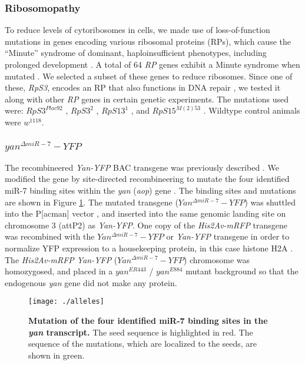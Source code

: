 \subsubsection{Ribosomopathy}
\label{appendix:supp:metabolism:exp:ribosomopathy}

To reduce levels of cytoribosomes in cells, we made use of loss-of-function mutations in genes encoding various ribosomal proteins (RPs), which cause the ``Minute'' syndrome of dominant, haploinsufficient phenotypes, including prolonged development \cite{Sæbøelarssen1998}. A total of 64 \textit{RP} genes exhibit a Minute syndrome when mutated \cite{Marygold2007}. We selected a subset of these genes to reduce ribosomes. Since one of these, \textit{RpS3}, encodes an RP that also functions in DNA repair \cite{Graifer2014}, we tested it along with other \textit{RP} genes in certain genetic experiments. The mutations used were: $RpS3^{Plac92}$ \cite{Sæbøelarssen1998}, $RpS3^{2}$ \cite{Ferrus1975}, $RpS13^{1}$ \cite{Sæbøelarssen1998}, and $RpS15^{M(2)53}$ \cite{Golic1996}. Wildtype control animals were $w^{1118}$.

\subsubsection{$yan^{\Delta miR-7}-YFP$}
\label{appendix:supp:metabolism:exp:yan_delta}

The recombineered \textit{Yan-YFP} BAC transgene was previously described \cite{Webber2013}. We modified the gene by site-directed recombineering to mutate the four identified miR-7 binding sites within the \textit{yan} (\textit{aop}) gene \cite{Li2005}. The binding sites and mutations are shown in Figure \ref{fig:metabolism:methods:alleles}. The mutated transgene ($Yan^{\Delta miR-7}-YFP$) was shuttled into the P{[}acman{]} vector \cite{Venken2006}, and inserted into the same genomic landing site on chromosome 3 (attP2) as \textit{Yan-YFP}. One copy of the \textit{His2Av-mRFP} transgene was recombined with the $Yan^{\Delta miR-7}-YFP$ or \textit{Yan-YFP} transgene in order to normalize YFP expression to a housekeeping protein, in this case histone H2A \cite{Pelaez2015a}. The \textit{His2Av-mRFP Yan-YFP} ($Yan^{\Delta miR-7}-YFP$) chromosome was homozygosed, and placed in a $yan^{ER443}$ / $yan^{E884}$ mutant background so that the endogenous \textit{yan} gene did not make any protein.

\begin{figure}[h!]
\centering
\captionsetup{width=.65\linewidth}
\texttt{[image: ./alleles]}
\caption[Mutation of the four identified miR-7 binding sites in the \textit{yan} transcript.]{\textbf{Mutation of the four identified miR-7 binding sites in the \textit{yan} transcript.} The seed sequence is highlighted in red. The sequence of the mutations, which are localized to the seeds, are shown in green.}
\label{fig:metabolism:methods:alleles}
\end{figure}

